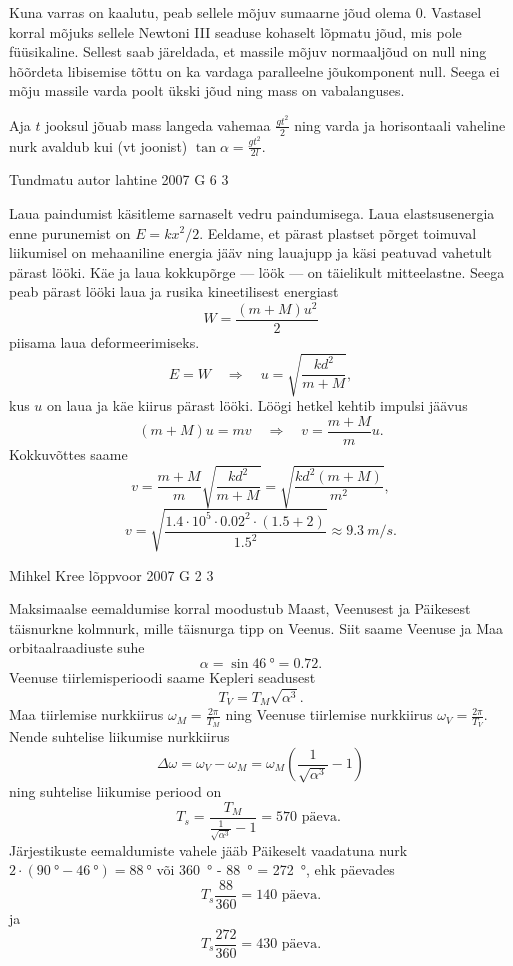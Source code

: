 \documentclass[11pt]{article}
\begin{document}
{{Kuna varras on kaalutu, peab sellele mõjuv sumaarne jõud olema \num{0}. Vastasel korral mõjuks sellele Newtoni III seaduse kohaselt lõpmatu jõud, mis pole füüsikaline. Sellest saab järeldada, et massile mõjuv normaaljõud on null ning hõõrdeta libisemise tõttu on ka vardaga paralleelne jõukomponent null. Seega ei mõju massile varda poolt ükski jõud ning mass on vabalanguses. 

Aja $t$ jooksul jõuab mass langeda vahemaa $\frac{gt^2}{2}$ ning varda ja horisontaali vaheline nurk avaldub kui (vt joonist) $\tan\alpha = \frac{gt^2}{2l}$.
\fi
}

{Tundmatu autor} %
{lahtine} %
{2007} %
{G 6} %
{3} %
{

\ifSolution
Laua paindumist käsitleme sarnaselt vedru paindumisega. Laua elastsusenergia enne purunemist on $E = kx^2/2$. Eeldame, et pärast plastset põrget toimuval liikumisel on mehaaniline energia jääv ning lauajupp ja käsi peatuvad vahetult pärast lööki. Käe ja laua kokkupõrge --- löök --- on täielikult mitteelastne. Seega peab pärast lööki laua ja rusika kineetilisest energiast
\[
W = \frac{(m+M)u^2}{2}
\]
piisama laua deformeerimiseks.
\[
E=W \quad \Rightarrow \quad u=\sqrt{\frac{k d^{2}}{m+M}},
\]
kus $u$ on laua ja käe kiirus pärast lööki. Löögi hetkel kehtib impulsi jäävus
\[
(m+M) u=m v \quad \Rightarrow \quad v=\frac{m+M}{m} u.
\]
Kokkuvõttes saame
\[
	v=\frac{m+M}{m} \sqrt{\frac{k d^{2}}{m+M}}=\sqrt{\frac{k d^{2}(m+M)}{m^{2}}},
\]
\[
	 v=\sqrt{\frac{\num{1,4} \cdot 10^{5} \cdot \num{0,02}^{2} \cdot(\num{1,5}+2)}{\num{1,5}^{2}}} \approx \SI{9,3}{m/s}.
\]
\fi
}

{Mihkel Kree} %
{lõppvoor} %
{2007} %
{G 2} %
{3} %
{

\ifSolution
\osa Maksimaalse eemaldumise korral moodustub Maast, Veenusest ja Päikesest täisnurkne kolmnurk, mille täisnurga tipp on Veenus. Siit saame Veenuse ja Maa orbitaalraadiuste suhe
\[
\alpha = \sin \SI{46}{\degree} = \num{0,72}.
\]
\osa Veenuse tiirlemisperioodi saame Kepleri seadusest
\[
T_V = T_M \sqrt{\alpha^3}.
\]
Maa tiirlemise nurkkiirus $\omega_M = \frac{2\pi}{T_M}$ ning Veenuse tiirlemise nurkkiirus $\omega_V = \frac{2\pi}{T_V}$. Nende suhtelise liikumise nurkkiirus
\[
\Delta \omega=\omega_{V}-\omega_{M}=\omega_{M}\left(\frac{1}{\sqrt{\alpha^{3}}}-1\right)
\]
ning suhtelise liikumise periood on
\[
T_{s}=\frac{T_{M}}{\frac{1}{\sqrt{\alpha^{3}}}-1}=570 \text { päeva. }
\]
Järjestikuste eemaldumiste vahele jääb Päikeselt vaadatuna nurk $2\cdot (\SI{90}{\degree} - \SI{46}{\degree}) = \SI{88}{\degree}$ või \SI{360}{\degree} - \SI{88}{\degree} = \SI{272}{\degree}, ehk päevades 
\[
T_s \frac{88}{360} = 140\text{ päeva.}
\]
ja 
\[
T_s \frac{272}{360} = 430\text{ päeva.}
\]
\fi
}

}
\end{document}

